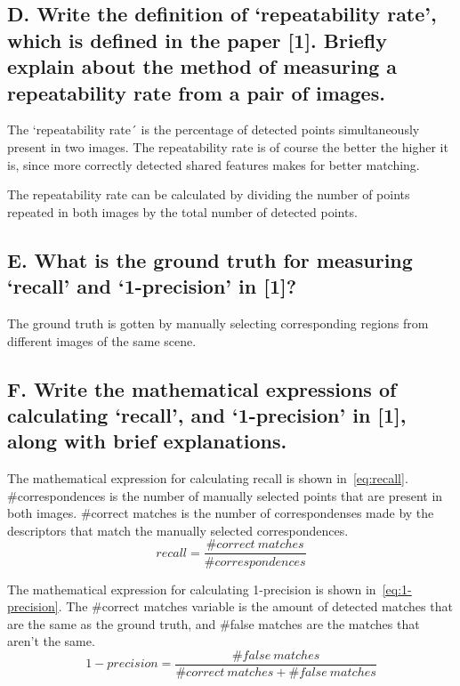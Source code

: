 \subsection{D. Write the definition of ‘repeatability rate’, which is defined in
the paper [1]. Briefly explain about the method of measuring a repeatability
rate from a pair of images.}

The `repeatability rate´ is the percentage of detected points simultaneously
present in two images. The repeatability rate is of course the better the
higher it is, since more correctly detected shared features makes for better
matching.

The repeatability rate can be calculated by dividing the number of points
repeated in both images by the total number of detected points.

\subsection{E. What is the ground truth for measuring ‘recall’ and ‘1-precision’
in [1]?}


The ground truth is gotten by manually selecting corresponding regions from
different images of the same scene.

\subsection{F. Write the mathematical expressions of calculating ‘recall’, and
‘1-precision’ in [1], along with brief explanations.}

The mathematical expression for calculating recall is shown in~\ref{eq:recall}.
\#correspondences is the number of manually selected points that are
present in both images. \#correct matches is the number of correspondenses made
by the descriptors that match the manually selected correspondences.
\begin{equation}
  recall = \frac{\#correct\ matches}{\#correspondences}
  \label{eq:recall}
\end{equation}

The mathematical expression for calculating 1-precision is shown
in~\ref{eq:1-precision}. The \#correct matches variable is the amount of
detected matches that are the same as the ground truth, and \#false matches are
the matches that aren't the same.
\begin{equation}
  1-precision = \frac{\#false\ matches}{\#correct\ matches + \#false\ matches}
  \label{eq:1-precision}
\end{equation}

